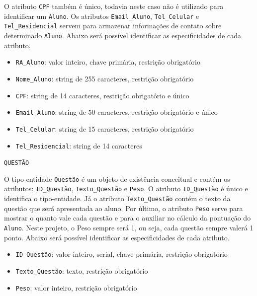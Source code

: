 \documentclass[12pt,a4paper]{article}
\begin{document}
O atributo {\texttt{CPF}} também é único, todavia neste caso não é utilizado para identificar um \texttt{Aluno}. Os atributos {\texttt{Email\_Aluno}}, {\texttt{Tel\_Celular} e \texttt{Tel\_Residencial}} servem para armazenar informações de contato sobre determinado \texttt{Aluno}. Abaixo será possível identificar as especificidades de cada atributo.\\

\begin{itemize}
    \item {\texttt{RA\_Aluno}}: valor inteiro, chave primária, restrição obrigatório
    \item {\texttt{Nome\_Aluno}}: string de 255 caracteres, restrição obrigatório
    \item \texttt{CPF}: string de 14 caracteres, restrição obrigatório e único
    \item \texttt{Email\_Aluno}: string de 50 caracteres, restrição obrigatório e único
    \item \texttt{Tel\_Celular}: string de 15 caracteres, restrição obrigatório
    \item \texttt{Tel\_Residencial}: string de 14 caracteres
\end{itemize}

\vspace{0.5cm}
\begin{center}
    \texttt{QUESTÃO}
\end{center}

O tipo-entidade \texttt{Questão} é um objeto de existência conceitual e contém os atributos: \texttt{ID\_Questão},  \texttt{Texto\_Questão} e \texttt{Peso}. O atributo \texttt{ID\_Questão} é único e identifica o tipo-entidade. Já o atributo \texttt{Texto\_Questão} contém o texto da questão que será apresentada ao aluno. Por último, o atributo \texttt{Peso} serve para mostrar o quanto vale cada questão e para o auxiliar no cálculo da pontuação do \texttt{Aluno}. Neste projeto, o Peso sempre será 1, ou seja, cada questão sempre valerá 1 ponto. Abaixo será possível identificar as especificidades de cada atributo.\\

\begin{itemize}
    \item \texttt{ID\_Questão}: valor inteiro, serial, chave primária, restrição obrigatório
    \item \texttt{Texto\_Questão}: texto, restrição obrigatório
    \item \texttt{Peso}: valor inteiro, restrição obrigatório
\end{itemize}
\end{document}
